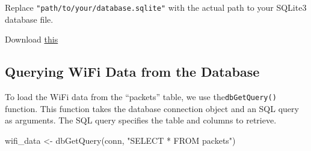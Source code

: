 \documentclass[
  letterpaper,
]{scrbook}
\newenvironment{Shaded}{\begin{snugshade}}{\end{snugshade}}
\newcommand{\FunctionTok}[1]{\textcolor[rgb]{0.28,0.35,0.67}{#1}}
\newcommand{\NormalTok}[1]{\textcolor[rgb]{0.00,0.23,0.31}{#1}}
\newcommand{\OtherTok}[1]{\textcolor[rgb]{0.00,0.23,0.31}{#1}}
\newcommand{\StringTok}[1]{\textcolor[rgb]{0.13,0.47,0.30}{#1}}
\begin{document}
Replace \texttt{"path/to/your/database.sqlite"} with the actual path to
your SQLite3 database file.

\begin{tcolorbox}[enhanced jigsaw, leftrule=.75mm, opacitybacktitle=0.6, toprule=.15mm, colback=white, colbacktitle=quarto-callout-note-color!10!white, toptitle=1mm, title=\textcolor{quarto-callout-note-color}{\faInfo}\hspace{0.5em}{If you don't have the WiFi DB}, arc=.35mm, coltitle=black, opacityback=0, left=2mm, bottomtitle=1mm, colframe=quarto-callout-note-color-frame, titlerule=0mm, breakable, bottomrule=.15mm, rightrule=.15mm]

Download \href{material/ch3/sample.sqlite3}{this}

\end{tcolorbox}

\subsection{Querying WiFi Data from the
Database}\label{querying-wifi-data-from-the-database}

To load the WiFi data from the ``packets'' table, we use
the\texttt{dbGetQuery()} function. This function takes the database
connection object and an SQL query as arguments. The SQL query specifies
the table and columns to retrieve.

\begin{Shaded}
\begin{Highlighting}[]
\NormalTok{wifi\_data }\OtherTok{\textless{}{-}} \FunctionTok{dbGetQuery}\NormalTok{(conn, }\StringTok{"SELECT * FROM packets"}\NormalTok{)}
\end{Highlighting}
\end{Shaded}
\end{document}
